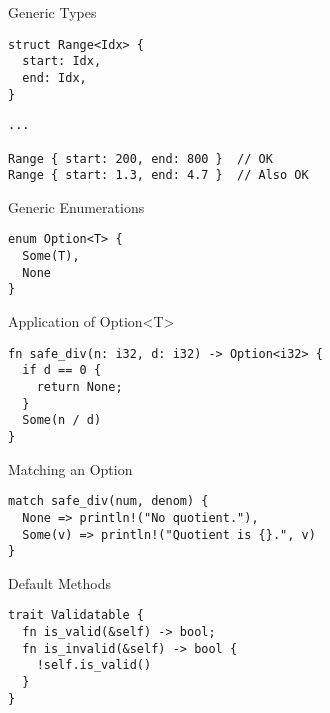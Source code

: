 
\begin{frame}[fragile]{Generic Types}
\begin{verbatim}
struct Range<Idx> {
  start: Idx,
  end: Idx,
}
\end{verbatim}
\pause
\begin{verbatim}
...

Range { start: 200, end: 800 }  // OK
Range { start: 1.3, end: 4.7 }  // Also OK
\end{verbatim}
\end{frame}


\begin{frame}[fragile]{ Generic Enumerations}
\begin{verbatim}
enum Option<T> {
  Some(T),
  None
}
\end{verbatim}
\end{frame}


\begin{frame}[fragile]{Application of Option<T>}
\begin{verbatim}
fn safe_div(n: i32, d: i32) -> Option<i32> {
  if d == 0 {
    return None;
  }
  Some(n / d)
}
\end{verbatim}
\end{frame}


\begin{frame}[fragile]{Matching an Option}
\begin{verbatim}
match safe_div(num, denom) {
  None => println!("No quotient."),
  Some(v) => println!("Quotient is {}.", v)
}
\end{verbatim}
\end{frame}


\begin{frame}[fragile]{Default Methods}
\begin{verbatim}
trait Validatable {
  fn is_valid(&self) -> bool;
  fn is_invalid(&self) -> bool {
    !self.is_valid()
  }
}
\end{verbatim}
\end{frame}
